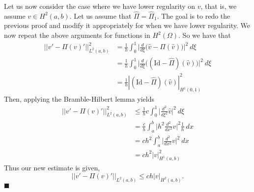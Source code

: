 \documentclass[11pt]{article}
\begin{document}
Let us now consider the case where we have lower regularity on $v$, that is, we assume $v \in H^2(a,b)$.
Let us assume that $\widehat{\Pi} = \widehat{\Pi}_1$.
The goal is to redo the previous proof and modify it appropriately for when we have lower regularity.
We now repeat the above arguments for functions in $H^2(\Omega)$.  
So we have that
\begin{align*}
    ||v' - \Pi(v)'||^2_{L^2(a,b)} &= \frac{1}{h} \int_0^1 \Big|\frac{d}{d\xi} \big(\hat{v} - \widehat{\Pi}(\hat{v})\big) \Big|^2 \: d\xi \\
    &= \frac{1}{h} \int_0^1 \Big|\frac{d}{d\xi} \big( (\text{Id} - \widehat{\Pi})(\hat{v})\big) \Big|^2 \: d\xi \\
    &= \frac{1}{h} |(\text{Id} - \widehat{\Pi})(\hat{v})|^2_{H^1(0,1)}
\end{align*}
Then, applying the Bramble-Hilbert lemma yields
\begin{align*}
    ||v' - \Pi(v)'||^2_{L^2(a,b)} &\leq \frac{1}{h} c \int_0^1 \Big| \frac{d^2}{d\xi^2} \hat{v} \Big|^2 \: d\xi \\
    &= \frac{c}{h} \int_a^b \Big| h^2 \frac{d^2}{dx^2} v \Big|^2 \frac{1}{h} \: dx \\
    &= ch^2 \int_a^b \Big| \frac{d^2}{dx^2} v \Big|^2 \: dx \\
    &= ch^2 |v|^2_{H^1(a,b)}
\end{align*}
Thus our new estimate is given, 
\begin{equation}
    ||v' - \Pi(v)'||_{L^2(a,b)} \leq ch|v|_{H^2(a,b)}.   
\end{equation}
$\blacksquare$
\end{document}
